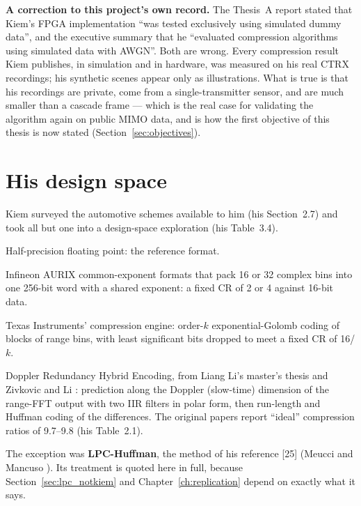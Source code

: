 \begin{keybox}
\textbf{A correction to this project's own record.} The Thesis~A report
stated that Kiem's FPGA implementation ``was tested exclusively using simulated
dummy data'', and the executive summary that he ``evaluated compression
algorithms using simulated data with AWGN''. Both are wrong. Every compression
result Kiem publishes, in simulation and in hardware, was measured on his
real CTRX recordings; his synthetic scenes appear only as illustrations. What
is true is that his recordings are private, come from a single-transmitter
sensor, and are much smaller than a cascade frame --- which is the real case for
validating the algorithm again on public MIMO data, and is how the first
objective of this thesis is now stated (Section~\ref{sec:objectives}).
\end{keybox}

\section{His design space}
\label{sec:kiem_space}

Kiem surveyed the automotive schemes available to him (his Section~2.7) and
took all but one into a design-space exploration (his Table~3.4).

\begin{description}[leftmargin=!,labelwidth=24mm,style=nextline,font=\normalfont\bfseries]
\item[FP16] Half-precision floating point: the reference format.
\item[CMPRA, CMPRB] Infineon AURIX common-exponent formats that pack 16 or 32
complex bins into one 256-bit word with a shared exponent: a fixed CR of 2 or 4
against 16-bit data.
\item[EGE10 \ldots EGE4] Texas Instruments' compression engine: order-$k$
exponential-Golomb coding of blocks of range bins, with least significant bits
dropped to meet a fixed CR of 16/$k$.
\item[DRHE] Doppler Redundancy Hybrid Encoding, from Liang Li's master's thesis
\cite{li2014} and Zivkovic and Li \cite{zivkovic2015}: prediction along the
Doppler (slow-time) dimension of the range-FFT output with two IIR filters in
polar form, then run-length and Huffman coding of the differences. The
original papers report ``ideal'' compression ratios of 9.7--9.8 (his
Table~2.1).
\end{description}

\noindent
The exception was \textbf{LPC-Huffman}, the method of his reference [25]
(Meucci and Mancuso \cite{meucci2022}). Its treatment is quoted here in full,
because Section~\ref{sec:lpc_notkiem} and Chapter~\ref{ch:replication} depend
on exactly what it says.

